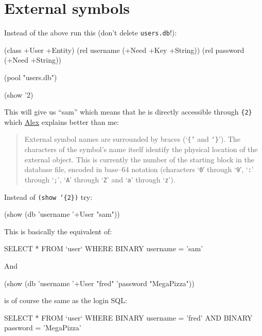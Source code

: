 \section{External symbols}
\label{sec:simple-oodb-external-symbols}

Instead of the above run this (don't delete \texttt{users.db}!):

\begin{wideverbatim}
(class +User +Entity)
(rel username (+Need +Key +String))
(rel password (+Need +String))

(pool "users.db")

(show '{2})
\end{wideverbatim}


This will give us ``sam'' which means that he is directly accessible
through \texttt{\{2\}} which
\href{http://www.software-lab.de/ref.html#external-io}{Alex} explains
better than me:

\begin{quote}
  External symbol names are surrounded by braces (`\texttt{\{'} and
  \texttt{`\}}'). The characters of the symbol's name itself identify
  the physical location of the external object. This is currently the
  number of the starting block in the database file, encoded in
  base--64 notation (characters `\texttt{0}′ through ‘\texttt{9}′,
  ‘\texttt{:}' through ‘\texttt{;}', `\texttt{A}' through `\texttt{Z}'
  and `\texttt{a}' through `\texttt{z}').
\end{quote}

Instead of \texttt{(show ‘\{2\})} try:


\begin{wideverbatim}
(show (db 'username '+User "sam"))
\end{wideverbatim}

This is basically the equivalent of:

\begin{wideverbatim}
SELECT * FROM `user` WHERE BINARY username = 'sam'
\end{wideverbatim}

And

\begin{wideverbatim}
(show (db 'username '+User "fred" 'password "MegaPizza"))
\end{wideverbatim}

is of course the same as the login SQL:

\begin{wideverbatim}
SELECT * FROM `user` WHERE BINARY username = 'fred' 
AND BINARY password = 'MegaPizza'
\end{wideverbatim}
